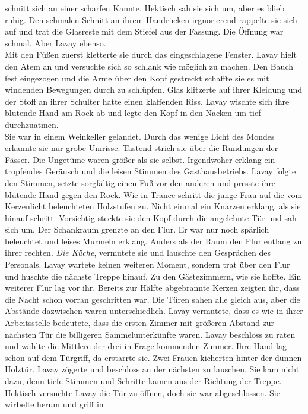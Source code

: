 schnitt sich an einer scharfen Kannte. Hektisch sah sie sich um, aber es blieb ruhig. Den schmalen 
Schnitt an ihrem Handrücken irgnorierend rappelte sie sich auf und trat die Glasreste mit dem 
Stiefel aus der Fassung. Die Öffnung war schmal. Aber Lavay ebenso.\\
Mit den Füßen zuerst kletterte sie durch das eingeschlagene Fenster. Lavay hielt den Atem an und 
versuchte sich so schlank wie möglich zu machen. Den Bauch fest eingezogen und die Arme über den 
Kopf gestreckt schaffte sie es mit windenden Bewegungen durch zu schlüpfen. Glas klitzerte auf 
ihrer Kleidung und der Stoff an ihrer Schulter hatte einen klaffenden Riss. Lavay wischte sich ihre 
blutende Hand am Rock ab und legte den Kopf in den Nacken um tief durchzuatmen.\\
Sie war in einem Weinkeller gelandet. Durch das wenige Licht des Mondes erkannte sie nur grobe 
Umrisse. Tastend strich sie über die Rundungen der Fässer. Die Ungetüme waren größer als sie 
selbst. Irgendwoher erklang ein tropfendes Geräusch und die leisen Stimmen des Gasthausbetriebs. 
Lavay folgte den Stimmen, setzte sorgfältig einen Fuß vor den anderen und presste ihre 
blutende Hand gegen den Rock. Wie in Trance schritt die junge Frau auf die vom Kerzenlicht 
beleuchteten Holzstufen zu. Nicht einmal ein Knarzen erklang, als sie hinauf schritt. Vorsichtig 
steckte sie den Kopf durch die angelehnte Tür und sah sich um. Der Schankraum grenzte an den Flur. 
Er war nur noch spärlich beleuchtet und leises Murmeln erklang. Anders als der Raum den Flur entlang 
zu ihrer rechten. \textit{Die Küche}, vermutete sie und lauschte den Gesprächen des Personals. Lavay 
wartete keinen weiteren Moment, sondern trat über den Flur und huschte die nächste Treppe hinauf. Zu 
den Gästezimmern, wie sie hoffte. Ein weiterer Flur lag vor ihr. Bereits zur Hälfte abgebrannte 
Kerzen zeigten ihr, dass die Nacht schon vorran geschritten war. Die Türen sahen alle gleich aus, 
aber die Abstände dazwischen waren unterschiedlich. Lavay vermutete, dass es wie in ihrer 
Arbeitsstelle bedeutete, dass die ersten Zimmer mit größeren Abstand zur nächsten Tür die 
billigeren Sammelunterkünfte waren. Lavay beschloss zu raten und wählte die Mittlere der drei in 
Frage kommenden Zimmer. Ihre Hand lag schon auf dem Türgriff, da erstarrte sie. Zwei Frauen 
kicherten hinter der dünnen Holztür. Lavay zögerte und beschloss an der nächsten zu lauschen. Sie 
kam nicht dazu, denn tiefe Stimmen und Schritte kamen aus der Richtung der Treppe. Hektisch 
versuchte Lavay die Tür zu öffnen, doch sie war abgeschlossen. Sie wirbelte herum und griff in 
